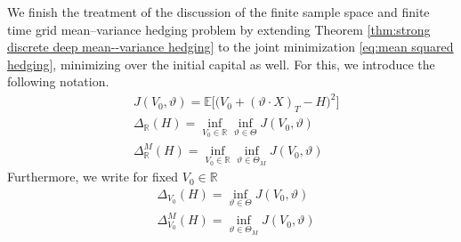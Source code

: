 \documentclass[11pt,a4paper,twoside,openany]{report}
\numberwithin{equation}{section}
\theoremstyle{plain} %
\theoremstyle{definition} %
\theoremstyle{remark} %
\begin{document}
We finish the treatment of the discussion of the finite sample space and finite time grid mean--variance hedging problem by extending Theorem \ref{thm:strong discrete deep mean--variance hedging} to the joint minimization \eqref{eq:mean squared hedging}, minimizing over the initial capital as well. For this, we introduce the following notation.
\begin{align*}  
&J(V_0,\vartheta)= \mathbb{E}\Big[\big(V_0+(\vartheta\cdot X)_T-H\big)^2\Big]\\
&\Delta_{\mathbb{R}}(H)=\inf_{V_0\in\mathbb{R}}\inf_{\vartheta\in \Theta}J(V_0,\vartheta)
\\
&\Delta^M_{\mathbb{R}}(H)=\inf_{V_0\in\mathbb{R}}\inf_{\vartheta\in \Theta_M}J(V_0,\vartheta)
\end{align*}
Furthermore, we write for fixed \(V_0\in\mathbb{R}\)
\begin{align*}
    &\Delta_{V_0}(H)=\inf_{\vartheta\in\Theta}J(V_0,\vartheta)\\
    &\Delta^M_{V_0}(H)=\inf_{\vartheta\in\Theta_M}J(V_0,\vartheta)
\end{align*}
\end{document}
